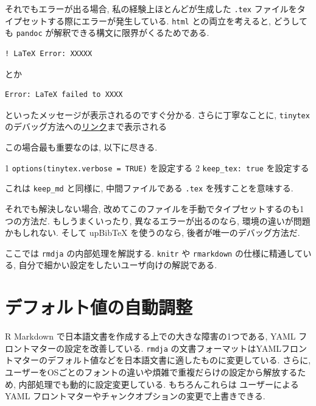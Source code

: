 \documentclass[
  nomag]{bxjsbook}
\theoremstyle{definition}
\theoremstyle{definition}
\theoremstyle{definition}
\theoremstyle{remark}
\begin{document}
それでもエラーが出る場合, 私の経験上ほとんどが生成した \texttt{.tex}
ファイルをタイプセットする際にエラーが発生している. \texttt{html}
との両立を考えると, どうしても \texttt{pandoc}
が解釈できる構文に限界がくるためである.

\begin{verbatim}
! LaTeX Error: XXXXX
\end{verbatim}

とか

\begin{verbatim}
Error: LaTeX failed to XXXX
\end{verbatim}

といったメッセージが表示されるのですぐ分かる. さらに丁寧なことに,
\texttt{tinytex}
のデバッグ方法への\href{https://yihui.org/tinytex/r/\#debugging}{リンク}まで表示される

この場合最も重要なのは, 以下に尽きる.

1 \texttt{options(tinytex.verbose\ =\ TRUE)} を設定する 2
\texttt{keep\_tex:\ true} を設定する

これは \texttt{keep\_md} と同様に, 中間ファイルである \texttt{.tex}
を残すことを意味する.

それでも解決しない場合,
改めてこのファイルを手動でタイプセットするのも1つの方法だ.
もしうまくいったり, 異なるエラーが出るのなら,
環境の違いが問題かもしれない. そして upBibTeX を使うのなら,
後者が唯一のデバッグ方法だ.

\hypertarget{appendix-ux88dcux907a}{%
\appendix}


ここでは \texttt{rmdja} の内部処理を解説する. \texttt{knitr} や
\texttt{rmarkdown} の仕様に精通している,
自分で細かい設定をしたいユーザ向けの解説である.

\hypertarget{ux30c7ux30d5ux30a9ux30ebux30c8ux5024ux306eux81eaux52d5ux8abfux6574}{%
\chapter{デフォルト値の自動調整}\label{ux30c7ux30d5ux30a9ux30ebux30c8ux5024ux306eux81eaux52d5ux8abfux6574}}

R Markdown で日本語文書を作成する上での大きな障害の1つである, YAML
フロントマターの設定を改善している. \texttt{rmdja}
の文書フォーマットはYAMLフロントマターのデフォルト値などを日本語文書に適したものに変更している.
さらに,
ユーザーをOSごとのフォントの違いや煩雑で重複だらけの設定から解放するため,
内部処理でも動的に設定変更している. もちろんこれらは ユーザーによる YAML
フロントマターやチャンクオプションの変更で上書きできる.
\end{document}
